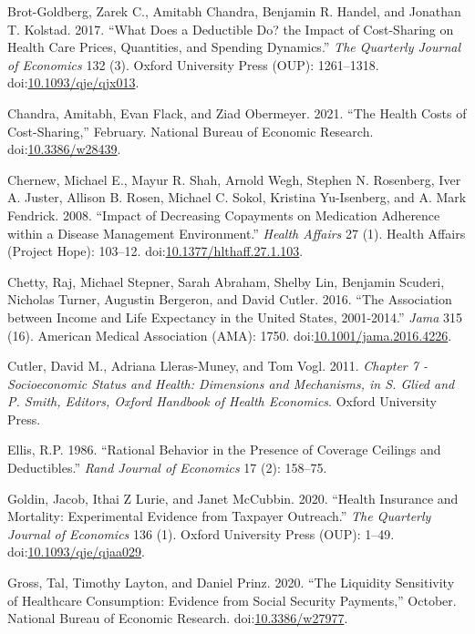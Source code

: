 \documentclass[a4paper,12pt]{article}
\begin{document}
\hypertarget{citeproc_bib_item_6}{Brot-Goldberg, Zarek C., Amitabh Chandra, Benjamin R. Handel, and Jonathan T. Kolstad. 2017. “What Does a Deductible Do? the Impact of Cost-Sharing on Health Care Prices, Quantities, and Spending Dynamics.” \textit{The Quarterly Journal of Economics} 132 (3). Oxford University Press (OUP): 1261–1318. doi:\href{https://doi.org/10.1093/qje/qjx013}{10.1093/qje/qjx013}.}

\hypertarget{citeproc_bib_item_7}{Chandra, Amitabh, Evan Flack, and Ziad Obermeyer. 2021. “The Health Costs of Cost-Sharing,” February. National Bureau of Economic Research. doi:\href{https://doi.org/10.3386/w28439}{10.3386/w28439}.}

\hypertarget{citeproc_bib_item_8}{Chernew, Michael E., Mayur R. Shah, Arnold Wegh, Stephen N. Rosenberg, Iver A. Juster, Allison B. Rosen, Michael C. Sokol, Kristina Yu-Isenberg, and A. Mark Fendrick. 2008. “Impact of Decreasing Copayments on Medication Adherence within a Disease Management Environment.” \textit{Health Affairs} 27 (1). Health Affairs (Project Hope): 103–12. doi:\href{https://doi.org/10.1377/hlthaff.27.1.103}{10.1377/hlthaff.27.1.103}.}

\hypertarget{citeproc_bib_item_9}{Chetty, Raj, Michael Stepner, Sarah Abraham, Shelby Lin, Benjamin Scuderi, Nicholas Turner, Augustin Bergeron, and David Cutler. 2016. “The Association between Income and Life Expectancy in the United States, 2001-2014.” \textit{Jama} 315 (16). American Medical Association (AMA): 1750. doi:\href{https://doi.org/10.1001/jama.2016.4226}{10.1001/jama.2016.4226}.}

\hypertarget{citeproc_bib_item_10}{Cutler, David M., Adriana Lleras-Muney, and Tom Vogl. 2011. \textit{Chapter 7 - Socioeconomic Status and Health: Dimensions and Mechanisms, in S. Glied and P. Smith, Editors, Oxford Handbook of Health Economics}. Oxford University Press.}

\hypertarget{citeproc_bib_item_11}{Ellis, R.P. 1986. “Rational Behavior in the Presence of Coverage Ceilings and Deductibles.” \textit{Rand Journal of Economics} 17 (2): 158–75.}

\hypertarget{citeproc_bib_item_12}{Goldin, Jacob, Ithai Z Lurie, and Janet McCubbin. 2020. “Health Insurance and Mortality: Experimental Evidence from Taxpayer Outreach.” \textit{The Quarterly Journal of Economics} 136 (1). Oxford University Press (OUP): 1–49. doi:\href{https://doi.org/10.1093/qje/qjaa029}{10.1093/qje/qjaa029}.}

\hypertarget{citeproc_bib_item_13}{Gross, Tal, Timothy Layton, and Daniel Prinz. 2020. “The Liquidity Sensitivity of Healthcare Consumption: Evidence from Social Security Payments,” October. National Bureau of Economic Research. doi:\href{https://doi.org/10.3386/w27977}{10.3386/w27977}.}
\end{document}
